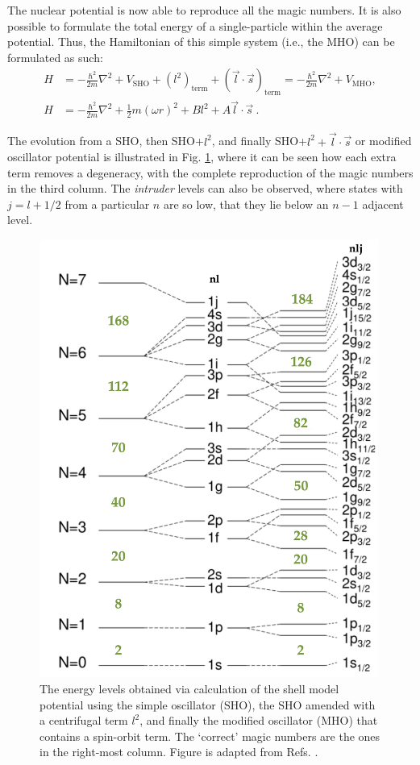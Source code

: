 The nuclear potential is now able to reproduce all the magic numbers. It is also possible to formulate the total energy of a single-particle within the average potential. Thus, the Hamiltonian of this simple system (i.e., the MHO) can be formulated as such:
\begin{align}
    H&=-\frac{\hbar^2}{2m}\nabla^2+V_\text{SHO}+(l^2)_\text{term}+(\vec{l}\cdot\vec{s})_\text{term}=-\frac{\hbar^2}{2m}\nabla^2+V_\text{MHO} , \nonumber\\
    H&=-\frac{\hbar^2}{2m}\nabla^2+\frac{1}{2}m(\omega r)^2+Bl^2+A\vec{l}\cdot\vec{s}\ .
\end{align}

The evolution from a SHO, then SHO+$l^2$, and finally SHO+$l^2+\vec{l}\cdot\vec{s}$ or modified oscillator potential is illustrated in Fig. \ref{energy-levels-mho}, where it can be seen how each extra term removes a degeneracy, with the complete reproduction of the magic numbers in the third column. The \emph{intruder} levels can also be observed, where states with $j=l+1/2$ from a particular $n$ are so low, that they lie below an $n-1$ adjacent level.
\begin{figure}
    \centering
    \includegraphics[width=0.99\textwidth]{Chapters/Figures/SM_level_scheme.png}
    \caption{The energy levels obtained via calculation of the shell model potential using the simple oscillator (SHO), the SHO amended with a centrifugal term $l^2$, and finally the modified oscillator (MHO) that contains a spin-orbit term. The `correct' magic numbers are the ones in the right-most column. Figure is adapted from Refs. \cite{krane1991introductory,matta2017exotic}.}
    \label{energy-levels-mho}
\end{figure}

